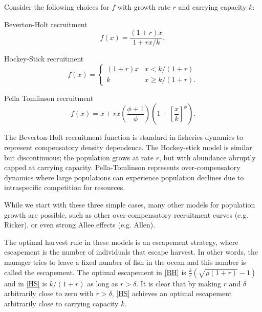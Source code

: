 \documentclass[]{elsarticle} %
\begin{document}
Consider the following choices for $f$ with growth rate $r$ and carrying capacity $k$: 

Beverton-Holt recruitment
\begin{equation}\label{BH}
f(x) = \frac{(1+r)x}{1 + rx/k}, 
\end{equation}

Hockey-Stick recruitment
\begin{equation}\label{HS}
f(x) = \begin{cases} 
(1+r)x & x < k/(1+r) \\
k & x\geq k/(1+r).
\end{cases}
\end{equation}

Pella Tomlinson recruitment
\begin{equation}\label{SA}
f(x) = x + rx\left(\frac{\phi+1}{\phi}\right)\left(1 - \left[\frac{x}{k}\right]^\phi\right). 
\end{equation}

The Beverton-Holt recruitment function is standard in fisheries dynamics to represent compensatory density dependence. The Hockey-stick model is similar but discontinuous; the population grows at rate $r$, but with abundance abruptly capped at carrying capacity. Pella-Tomlinson represents over-compensatory dynamics where large populations can experience population declines due to intraspecific competition for resources. 

While we start with these three simple cases, many other models for population growth are possible, such as other over-compensatory recruitment curves (e.g. Ricker), or even strong Allee effects (e.g. Allen).

%

The optimal harvest rule in these models is an escapement strategy, where escapement is the number of individuals that escape harvest. In other words, the manager tries to leave a fixed number of fish in the ocean and this number is called the escapement. The optimal escapement in \eqref{BH} is $\frac{k}{r} ( \sqrt{ \rho (1+r) } - 1)$ and in \eqref{HS} is $k/(1+r)$ as long as $r>\delta$. It is clear that by making $r$ and $\delta$ arbitrarily close to zero with $r>\delta$, \eqref{HS} achieves an optimal escapement arbitrarily close to carrying capacity $k$. 
\end{document}
